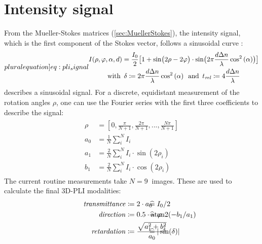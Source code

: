 \section{Intensity signal}\label{sec::intSignal}
%
From the Mueller-Stokes matrices (\cref{sec:MuellerStokes}), the intensity signal, which is the first component of the Stokes vector, follows a sinusoidal curve \cite{MenzelMaster,MenzelDissertation}:
%
\begin{align}
\label[pluralequation]{eq:pli_signal}
\centering
\begin{gathered}
I(\rho, \varphi, \alpha, d) =\frac{I_0}{2}\bigl[ 1+ \sin\bigl(2\rho - 2\varphi \bigr)\cdot \sin \bigl( 2\pi\frac{d \dn}{\lambda} \cos^2\left( \alpha \right) \bigr) \bigr] \\
\text{with} \enspace \delta \coloneqq 2\pi\frac{d \dn}{\lambda} \cos^2\left( \alpha \right) \enspace
\text{and} \enspace \trel \coloneqq 4 \frac{d \dn}{\lambda}
\end{gathered}
\end{align}
%
 describes a sinusoidal signal.
For a discrete, equidistant measurement of the rotation angles $\rho$, one can use the Fourier series with the first three coefficients to describe the signal:
%
\begin{align}
\begin{split}
\rho &= [0, \frac{\pi}{N+1}, \frac{2\pi}{N+1}, ..., \frac{N\pi}{N+1}]\\
a_0 &= \frac{1}{N} \sum_i^N I_i\\
a_1 &= \frac{2}{N} \sum_i^N I_i \cdot \sin(2 \rho_i)\\
b_1 &= \frac{2}{N} \sum_i^N I_i \cdot \cos(2 \rho_i)
\end{split}
\end{align}
%
The current routine measurements take $N=\SI{9}{}$ images.
These are used to calculate the final \ac{3D-PLI} modalities:
%
\begin{align}
\begin{split}
\mathit{transmittance} &\coloneqq 2 \cdot a_0 \vphantom{I_0/2} \\
\mathit{direction} &\coloneqq 0.5 \cdot \atantwo(-b_1 / a_1) \vphantom{\varphi} \\
\mathit{retardation} &\coloneqq \frac{\sqrt{a_1^2 + b_1^2}}{a_0}  \vphantom{\sin(\delta)}
\end{split}
\hspace{-7em}
\begin{split}
& \mathrel{\widehat{=}} I_0/2 \vphantom{2 \cdot a_0}\\
& \mathrel{\widehat{=}} \varphi \vphantom{0.5 \cdot \atantwo(-b_1 / a_1)} \\
& \mathrel{\widehat{=}} |\sin(\delta)| \vphantom{\frac{\sqrt{a_1^2 + b_1^2}}{a_0}}
\end{split}
\end{align}

